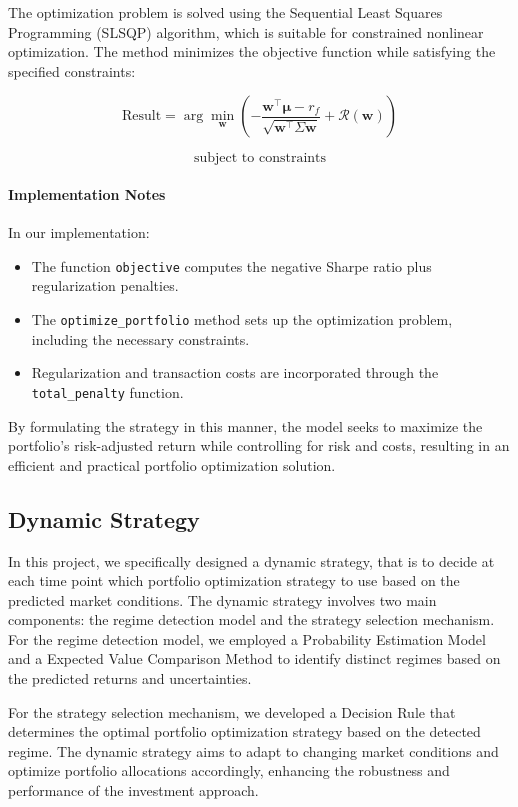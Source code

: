 The optimization problem is solved using the Sequential Least Squares Programming (SLSQP) algorithm, which is suitable for constrained nonlinear optimization. The method minimizes the objective function while satisfying the specified constraints:

\[
\text{Result} = \arg\min_{\mathbf{w}} \left( -\dfrac{\mathbf{w}^\top \boldsymbol{\mu} - r_f}{\sqrt{\mathbf{w}^\top \Sigma \mathbf{w}}} + \mathcal{R}(\mathbf{w}) \right)
\]

\[
\text{subject to constraints}
\]

\paragraph{Implementation Notes}

In our implementation:

\begin{itemize}
    \item The function \texttt{objective} computes the negative Sharpe ratio plus regularization penalties.
    \item The \texttt{optimize\_portfolio} method sets up the optimization problem, including the necessary constraints.
    \item Regularization and transaction costs are incorporated through the \texttt{total\_penalty} function.
\end{itemize}

By formulating the strategy in this manner, the model seeks to maximize the portfolio's risk-adjusted return while controlling for risk and costs, resulting in an efficient and practical portfolio optimization solution.


\subsection{Dynamic Strategy}
In this project, we specifically designed a dynamic strategy, that is to decide at each time point which portfolio optimization strategy to use based on the predicted market conditions. The dynamic strategy involves two main components: the regime detection model and the strategy selection mechanism.
For the regime detection model, we employed a Probability Estimation Model and a Expected Value Comparison Method to identify distinct regimes based on the predicted returns and uncertainties. 

For the strategy selection mechanism, we developed a Decision Rule that determines the optimal portfolio optimization strategy based on the detected regime. The dynamic strategy aims to adapt to changing market conditions and optimize portfolio allocations accordingly, enhancing the robustness and performance of the investment approach.
